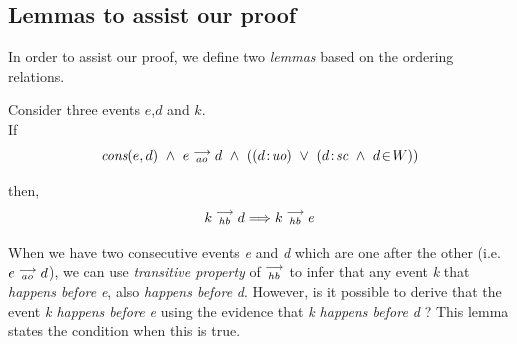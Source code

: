 \subsection{Lemmas to assist our proof}    
In order to assist our proof, we define two \textit{lemmas} based on the ordering relations. 

\begin{lemma} 
    \label{Lemma1}
    Consider three events $e$,$d$ and $k$. \\

    If
        \[
            \cons{e}{d} \ \wedge \ \reln{e}{ao}{d} \ \wedge \
            (
                (\et{d}{uo}) \ \vee \
                (\et{d}{sc} \ \wedge \ \event{d}{W})
            )
        \]
        
    then,
        \[
            k\stackrel{\longrightarrow}{_{hb}}d \Longrightarrow k\stackrel{\longrightarrow}{_{hb}}e
        \]
      
    When we have two consecutive events \textit{e} and \textit{d} which are one after the other (i.e. $e\stackrel{\longrightarrow}{_{ao}}d$), we can use \textit{transitive property} of $\stackrel{\longrightarrow}{_{hb}}$ to infer that any event \textit{k} that \textit{happens before} \textit{e}, also \textit{happens before} \textit{d}. However, is it possible to derive that the event \textit{k happens before e} using the evidence that \textit{k happens before d} ? This lemma states the condition when this is true.
    
\end{lemma}

